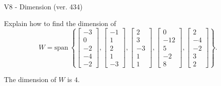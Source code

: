 \begin{exercise}
  \begin{exerciseTitle}V8 - Dimension (ver. 434)\end{exerciseTitle}
  \begin{exerciseStatement}
    Explain how to find the dimension of 
\[W=\mathrm{span}\ \left\{\left[\begin{array}{r}
-3 \\
0 \\
-2 \\
-4 \\
-2
\end{array}\right] , \left[\begin{array}{r}
-1 \\
1 \\
2 \\
1 \\
-3
\end{array}\right] , \left[\begin{array}{r}
2 \\
3 \\
-3 \\
1 \\
1
\end{array}\right] , \left[\begin{array}{r}
0 \\
-12 \\
5 \\
-2 \\
8
\end{array}\right] , \left[\begin{array}{r}
2 \\
-4 \\
-2 \\
3 \\
2
\end{array}\right]\right\}.\]



  \end{exerciseStatement}
  \begin{exerciseAnswer}
   The dimension of \(W\) is  \(4\).
  


  \end{exerciseAnswer}
\end{exercise}